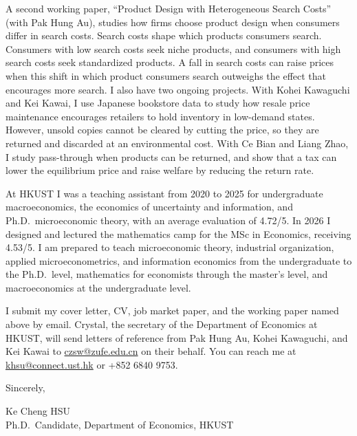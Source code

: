 \documentclass[11pt]{article}
\begin{document}
A second working paper, ``Product Design with Heterogeneous Search Costs'' (with Pak Hung Au), studies how firms choose product design when consumers differ in search costs. Search costs shape which products consumers search. Consumers with low search costs seek niche products, and consumers with high search costs seek standardized products. A fall in search costs can raise prices when this shift in which product consumers search outweighs the effect that encourages more search. I also have two ongoing projects. With Kohei Kawaguchi and Kei Kawai, I use Japanese bookstore data to study how resale price maintenance encourages retailers to hold inventory in low-demand states. However, unsold copies cannot be cleared by cutting the price, so they are returned and discarded at an environmental cost. With Ce Bian and Liang Zhao, I study pass-through when products can be returned, and show that a tax can lower the equilibrium price and raise welfare by reducing the return rate.

At HKUST I was a teaching assistant from 2020 to 2025 for undergraduate macroeconomics, the economics of uncertainty and information, and Ph.D.\ microeconomic theory, with an average evaluation of 4.72/5. In 2026 I designed and lectured the mathematics camp for the MSc in Economics, receiving 4.53/5. I am prepared to teach microeconomic theory, industrial organization, applied microeconometrics, and information economics from the undergraduate to the Ph.D.\ level, mathematics for economists through the master's level, and macroeconomics at the undergraduate level.

I submit my cover letter, CV, job market paper, and the working paper named above by email. Crystal, the secretary of the Department of Economics at HKUST, will send letters of reference from Pak Hung Au, Kohei Kawaguchi, and Kei Kawai to \href{mailto:czsw@zufe.edu.cn}{czsw@zufe.edu.cn} on their behalf. You can reach me at \href{mailto:khsu@connect.ust.hk}{khsu@connect.ust.hk} or +852 6840 9753.

\vspace{0.25em}
Sincerely,

\vspace{0.25em}
Ke Cheng HSU \\
Ph.D.\ Candidate, Department of Economics, HKUST
\end{document}
